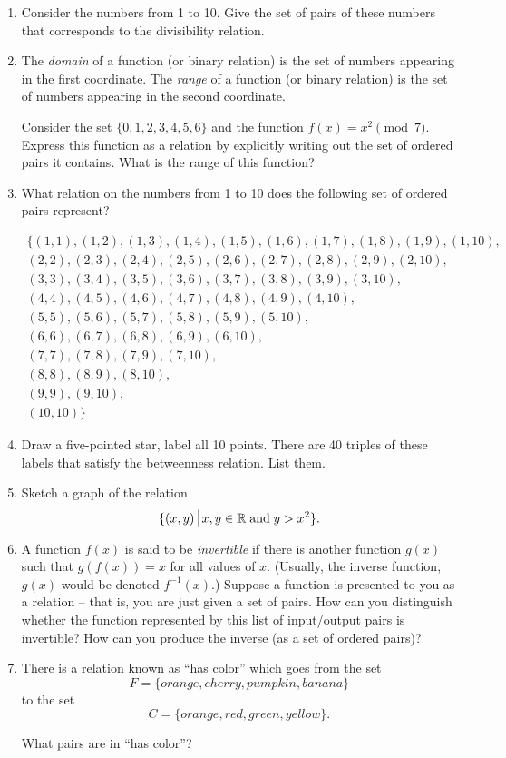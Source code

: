 \begin{enumerate}

\item Consider the numbers from 1 to 10.  Give the set of pairs of these numbers that 
corresponds to the divisibility relation.

\item The \emph{domain} of a function (or binary relation) 
is the set of numbers appearing in the first coordinate.  The  
\emph{range} of a function (or binary relation) is the set of numbers 
appearing in the second coordinate.  

Consider the set $\{0,1,2,3,4,5,6\}$ and the function $f(x) = x^2 \pmod{7}$.
Express this function as a relation by explicitly writing out the set of
ordered pairs it contains.  What is the range of this function?
 
\item What relation on the numbers from 1 to 10 does the following set of ordered pairs
represent?

\begin{gather*}
\{ (1,1), (1,2), (1,3), (1,4), (1,5), (1,6), (1,7), (1,8), (1,9), (1,10), \\
(2,2), (2,3), (2,4), (2,5), (2,6), (2,7), (2,8), (2,9), (2,10), \\
(3,3), (3,4), (3,5), (3,6), (3,7), (3,8), (3,9), (3,10), \\
(4,4), (4,5), (4,6), (4,7), (4,8), (4,9), (4,10), \\
(5,5), (5,6), (5,7), (5,8), (5,9), (5,10), \\
(6,6), (6,7), (6,8), (6,9), (6,10), \\
(7,7), (7,8), (7,9), (7,10), \\
(8,8), (8,9), (8,10), \\
(9,9), (9,10), \\
(10,10) \} 
\end{gather*}

\item Draw a five-pointed star, label all 10 points. There are 40 triples of these 
labels that satisfy the betweenness relation.  List them.

\item Sketch a graph of the relation 
\[
\{ (x,y) \suchthat x,y \in \Reals \; \mbox{and} \; y > x^2 \}.
\]

\item A function $f(x)$ is said to be  
\emph{invertible} if there is another function $g(x)$ such that 
$g(f(x)) = x$ for all values of $x$.  (Usually, the inverse function,
$g(x)$ would be denoted $f^{-1}(x)$.)   Suppose a function is presented 
to you as a relation -- that is, you are just given a set of pairs.  
How can you distinguish whether the function represented by this list 
of input/output pairs is invertible?  How can you produce the inverse 
(as a set of ordered pairs)?
 
\item There is a relation known as ``has color'' which goes from the
set 
\[ F = \{orange, cherry, pumpkin, banana\} \]
to the set 
\[ C = \{orange, red, green, yellow\}. \]

\noindent  What pairs are in ``has color''?
   
\end{enumerate}
